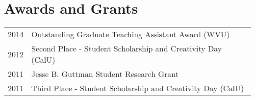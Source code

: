 \documentclass[letterpaper]{deedy-resume} %
\begin{document}
\begin{minipage}[t]{0.63\textwidth}
\sectionspace %

\vspace{-3pt}
\section{Awards and Grants} 

\begin{tabular}{rl}
2014 & Outstanding Graduate Teaching Assistant Award (WVU)\\
2012 & Second Place - Student Scholarship and Creativity Day (CalU)\\
2011 & Jesse B. Guttman Student Research Grant\\
2011 & Third Place - Student Scholarship and Creativity Day (CalU)\\
\end{tabular}

\sectionspace %




\end{minipage} %








\end{document}
